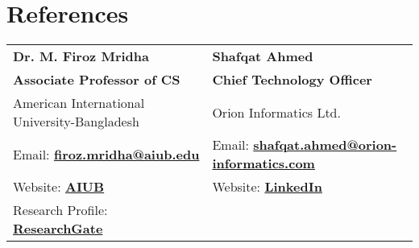\documentclass[letterpaper,11pt]{article}
\newcommand{\resumeSubHeadingListStart}{\begin{itemize}[leftmargin=0.0in, label={}]}
\newcommand{\resumeSubHeadingListEnd}{\end{itemize}}
\begin{document}

\section{References}
\hspace{7pt}
\begin{tabularx}{\textwidth}{p{}p{}}
	\textbf{Dr. M. Firoz Mridha}                                                           & \textbf{Shafqat Ahmed}                                                                                   \\
	\textbf{Associate Professor of CS}                                                     & \textbf{Chief Technology Officer}                                                                        \\
	American International University-Bangladesh                                           & Orion Informatics Ltd.                                                                                   \\
	Email: \href{mailto:firoz.mridha@aiub.edu}{\bf firoz.mridha@aiub.edu}                  & Email: \href{mailto:shafqat.ahmed@orion-informatics.com}{\bf \mbox{shafqat.ahmed@orion-informatics.com}} \\
	Website: \href{https://cs.aiub.edu/profile/firoz.mridha}{\bf AIUB}                     & Website: \href{https://www.linkedin.com/in/shafqatahmed/}{\bf LinkedIn}                                  \\
	Research Profile: \href{https://www.researchgate.net/profile/M-Ph-D}{\bf ResearchGate} &                                                                                                          \\
\end{tabularx}
\end{document}
